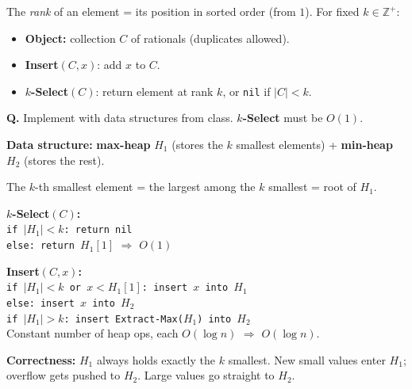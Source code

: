 \documentclass[11pt]{article}
\begin{document}
\begin{exambox}
The \emph{rank} of an element = its position in sorted order (from $1$). For fixed $k \in \mathbb{Z}^+$:
\begin{itemize}[leftmargin=1.4em,itemsep=1pt]
  \item \textbf{Object:} collection $C$ of rationals (duplicates allowed).
  \item \textbf{Insert}$(C,x)$: add $x$ to $C$.
  \item \textbf{$k$-Select}$(C)$: return element at rank $k$, or \texttt{nil} if $|C| < k$.
\end{itemize}
\textbf{Q.} Implement with data structures from class. \textbf{$k$-Select} must be $O(1)$.

\begin{answerband}
\textbf{Data structure:} \textbf{max-heap} $H_1$ (stores the $k$ smallest elements) + \textbf{min-heap} $H_2$ (stores the rest).

The $k$-th smallest element = the largest among the $k$ smallest = root of $H_1$.

\smallskip
\textbf{$k$-Select$(C)$:}\\
\hspace*{1.5em}\texttt{if $|H_1| < k$: return nil}\\
\hspace*{1.5em}\texttt{else: return $H_1[1]$} \hfill $\Rightarrow$ \textcolor{greenO}{$O(1)$}

\smallskip
\textbf{Insert$(C,x)$:}\\
\hspace*{1.5em}\texttt{if $|H_1| < k$ or $x < H_1[1]$: insert $x$ into $H_1$}\\
\hspace*{1.5em}\texttt{else: insert $x$ into $H_2$}\\
\hspace*{1.5em}\texttt{if $|H_1| > k$: insert Extract-Max($H_1$) into $H_2$}\\
Constant number of heap ops, each $O(\log n)$ $\Rightarrow$ \textcolor{violetT}{$O(\log n)$}.

\smallskip
\textbf{Correctness:} $H_1$ always holds exactly the $k$ smallest. New small values enter $H_1$; overflow gets pushed to $H_2$. Large values go straight to $H_2$.
\end{answerband}
\end{exambox}

\end{document}
